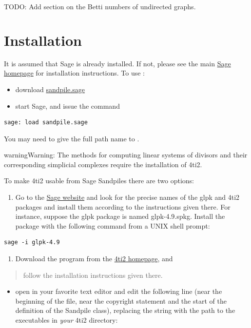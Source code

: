 \documentclass[letterpaper,10pt,english]{manual}
\begin{document}
TODO: Add section on the Betti numbers of undirected graphs.


\chapter{Installation}

It is assumed that Sage is already installed.  If not, please see
the main \href{http://www.sagemath.org}{Sage homepage} for installation instructions.
To use :
\begin{itemize}
\item {} 
download \href{http://www.reed.edu/\textasciitilde{}davidp/sand}{sandpile.sage}

\item {} 
start Sage, and issue the command

\end{itemize}

\begin{Verbatim}[commandchars=@\[\]]
sage: load sandpile.sage
\end{Verbatim}

You may need to give the full path name to .

\begin{notice}{warning}{Warning:}
The methods for computing linear systems of divisors and their corresponding
simplicial complexes require the installation of 4ti2.
\end{notice}

To make 4ti2 usable from Sage Sandpiles there are two options:
\begin{enumerate}
\item {} 
Go to the \href{http://sagemath.org/download-packages.html}{Sage website} and
look for the precise names of the glpk and 4ti2 packages and install them
according to the instructions given there.  For instance, suppose the glpk
package is named glpk-4.9.spkg.  Install the package with the following
command from a UNIX shell prompt:

\end{enumerate}

\begin{Verbatim}[commandchars=@\[\]]
sage -i glpk-4.9
\end{Verbatim}
\begin{enumerate}
\item {} 
Download the program from the \href{http://www.4ti2.de/}{4ti2 homepage}, and

\end{enumerate}
\begin{quote}

follow the installation instructions given there.
\end{quote}
\begin{itemize}
\item {} 
open  in your favorite text editor and edit the following
line (near the beginning of the file, near the copyright statement and the
start of the definition of the Sandpile class), replacing the
 string with the path to the executables in \emph{your} 4ti2
directory:

\end{itemize}
\end{document}
